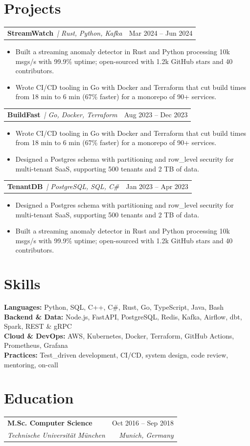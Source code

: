 \documentclass[10pt]{article}
\makeatletter
\newcommand{\resumeEntry}[4]{%
  \begin{tabularx}{\linewidth}{@{}X r@{}}
    \textbf{#1} & \small #2\\
    \textit{\small #3} & \textit{\small #4}
  \end{tabularx}\vspace{-2pt}}
\newcommand{\resumeProject}[3]{%
  \begin{tabularx}{\linewidth}{@{}X r@{}}
    \textbf{#1} \,\textit{\small | #2} & \small #3
  \end{tabularx}\vspace{-2pt}}
\newenvironment{resumeItems}{\begin{itemize}\small}{\end{itemize}\vspace{2pt}}
\newcommand{\resumeItem}[1]{\item #1}
\newcommand{\skillLine}[2]{\small\textbf{#1:} #2\\}
\makeatother
\begin{document}
\section{Projects}
\resumeProject{StreamWatch}{Rust, Python, Kafka}{Mar 2024 -- Jun 2024}
\begin{resumeItems}
  \resumeItem{Built a streaming anomaly detector in Rust and Python processing 10k msgs/s with 99.9\% uptime; open-sourced with 1.2k GitHub stars and 40 contributors.}
  \resumeItem{Wrote CI/CD tooling in Go with Docker and Terraform that cut build times from 18 min to 6 min (67\% faster) for a monorepo of 90+ services.}
\end{resumeItems}
\resumeProject{BuildFast}{Go, Docker, Terraform}{Aug 2023 -- Dec 2023}
\begin{resumeItems}
  \resumeItem{Wrote CI/CD tooling in Go with Docker and Terraform that cut build times from 18 min to 6 min (67\% faster) for a monorepo of 90+ services.}
  \resumeItem{Designed a Postgres schema with partitioning and row\_level security for multi-tenant SaaS, supporting 500 tenants and 2 TB of data.}
\end{resumeItems}
\resumeProject{TenantDB}{PostgreSQL, SQL, C\#}{Jan 2023 -- Apr 2023}
\begin{resumeItems}
  \resumeItem{Designed a Postgres schema with partitioning and row\_level security for multi-tenant SaaS, supporting 500 tenants and 2 TB of data.}
  \resumeItem{Built a streaming anomaly detector in Rust and Python processing 10k msgs/s with 99.9\% uptime; open-sourced with 1.2k GitHub stars and 40 contributors.}
\end{resumeItems}


\section{Skills}
\skillLine{Languages}{Python, SQL, C++, C\#, Rust, Go, TypeScript, Java, Bash}
\skillLine{Backend \& Data}{Node.js, FastAPI, PostgreSQL, Redis, Kafka, Airflow, dbt, Spark, REST \& gRPC}
\skillLine{Cloud \& DevOps}{AWS, Kubernetes, Docker, Terraform, GitHub Actions, Prometheus, Grafana}
\skillLine{Practices}{Test\_driven development, CI/CD, system design, code review, mentoring, on-call}
\section{Education}
\resumeEntry{M.Sc. Computer Science}{Oct 2016 -- Sep 2018}{Technische Universität München}{Munich, Germany}
\end{document}
